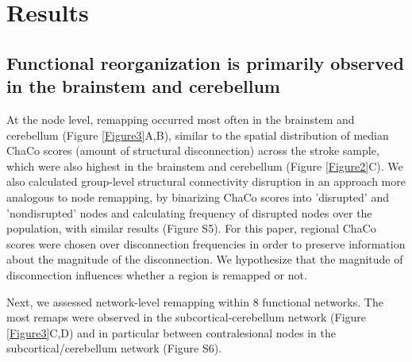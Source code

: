 \documentclass[phd,tocprelim]{cornell}
\begin{document}
	
\section{Results}
	\subsection{Functional reorganization is primarily observed in the brainstem and cerebellum}
	At the node level, remapping occurred most often in the brainstem and cerebellum (Figure \ref{Figure3}A,B), similar to the spatial distribution of median ChaCo scores (amount of structural disconnection) across the stroke sample, which were also highest in the brainstem and cerebellum (Figure \ref{Figure2}C). We also calculated group-level structural connectivity disruption in an approach more analogous to node remapping, by binarizing ChaCo scores into 'disrupted' and 'nondisrupted' nodes and calculating frequency of disrupted nodes over the population, with similar results (Figure S5). For this paper, regional ChaCo scores were chosen over disconnection frequencies in order to preserve information about the magnitude of the disconnection. We hypothesize that the magnitude of disconnection influences whether a region is remapped or not.
	
	Next, we assessed network-level remapping within 8 functional networks. The most remaps were observed in the subcortical-cerebellum network (Figure \ref{Figure3}C,D) and in particular between contralesional nodes in the subcortical/cerebellum network (Figure S6).
	
\end{document}
